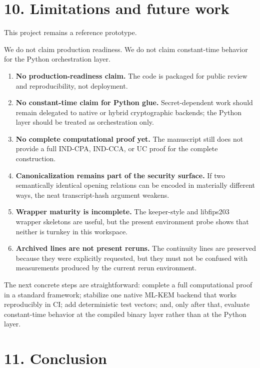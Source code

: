 \documentclass[
  11pt,
]{article}
\providecommand{\tightlist}{%
  \setlength{\itemsep}{0pt}\setlength{\parskip}{0pt}}
\begin{document}
\section{10. Limitations and future
work}\label{limitations-and-future-work}

This project remains a reference prototype.

We do not claim production readiness. We do not claim constant-time
behavior for the Python orchestration layer.

\begin{enumerate}
\def\labelenumi{\arabic{enumi}.}
\tightlist
\item
  \textbf{No production-readiness claim.} The code is packaged for
  public review and reproducibility, not deployment.
\item
  \textbf{No constant-time claim for Python glue.} Secret-dependent work
  should remain delegated to native or hybrid cryptographic backends;
  the Python layer should be treated as orchestration only.
\item
  \textbf{No complete computational proof yet.} The manuscript still
  does not provide a full IND-CPA, IND-CCA, or UC proof for the complete
  construction.
\item
  \textbf{Canonicalization remains part of the security surface.} If two
  semantically identical opening relations can be encoded in materially
  different ways, the neat transcript-hash argument weakens.
\item
  \textbf{Wrapper maturity is incomplete.} The keeper-style and
  libfips203 wrapper skeletons are useful, but the present environment
  probe shows that neither is turnkey in this workspace.
\item
  \textbf{Archived lines are not present reruns.} The continuity lines
  are preserved because they were explicitly requested, but they must
  not be confused with measurements produced by the current rerun
  environment.
\end{enumerate}

The next concrete steps are straightforward: complete a full
computational proof in a standard framework; stabilize one native ML-KEM
backend that works reproducibly in CI; add deterministic test vectors;
and, only after that, evaluate constant-time behavior at the compiled
binary layer rather than at the Python layer.

\section{11. Conclusion}\label{conclusion}
\end{document}
